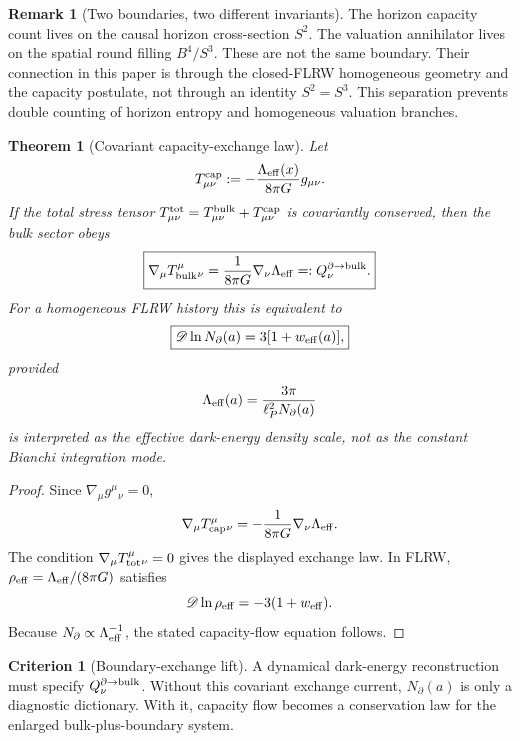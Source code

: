 \documentclass[aps,prd,reprint,nofootinbib,superscriptaddress,floatfix]{revtex4-2}
\numberwithin{equation}{section}
\theoremstyle{definition}
\newtheorem{criterion}{Criterion}[section]
\newtheorem{remark}{Remark}[section]
\theoremstyle{plain}
\newtheorem{theorem}{Theorem}[section]
\newcommand{\Dil}{\mathscr D}
\newcommand{\Ncap}{N_{\partial}}
\begin{document}
\begin{remark}[Two boundaries, two different invariants]
The horizon capacity count lives on the causal horizon cross-section
\(S^2\).  The valuation annihilator lives on the spatial round filling
\(B^4/S^3\).  These are not the same boundary.  Their connection in this
paper is through the closed-FLRW homogeneous geometry and the capacity
postulate, not through an identity \(S^2=S^3\).  This separation prevents
double counting of horizon entropy and homogeneous valuation branches.
\end{remark}

\begin{theorem}[Covariant capacity-exchange law]
\label{thm:covariant-exchange-law}
Let
\begin{equation}
T^{\rm cap}_{\mu\nu}:=-\frac{\Lambda_{\rm eff}(x)}{8\pi G}g_{\mu\nu}.
\end{equation}
If the total stress tensor \(T^{\rm tot}_{\mu\nu}=T^{\rm bulk}_{\mu\nu}+T^{\rm cap}_{\mu\nu}\) is covariantly conserved, then the bulk sector obeys
\begin{equation}
\boxed{
\nabla_\mu T_{\rm bulk}^{\mu}{}_{\nu}
=
\frac{1}{8\pi G}\nabla_\nu\Lambda_{\rm eff}
=:Q_\nu^{\partial\to{\rm bulk}} .
}
\end{equation}
For a homogeneous FLRW history this is equivalent to
\begin{equation}
\boxed{
\Dil\ln\Ncap(a)=3[1+w_{\rm eff}(a)],
}
\end{equation}
provided
\[
\Lambda_{\rm eff}(a)=\frac{3\pi}{\ell_P^2\Ncap(a)}
\]
is interpreted as the effective dark-energy density scale, not as the constant Bianchi integration mode.
\end{theorem}

\begin{proof}
Since \(\nabla_\mu g^{\mu}{}_{\nu}=0\),
\[
\nabla_\mu T_{\rm cap}^{\mu}{}_{\nu}
=
-\frac{1}{8\pi G}\nabla_\nu\Lambda_{\rm eff}.
\]
The condition \(\nabla_\mu T_{\rm tot}^{\mu}{}_{\nu}=0\) gives the displayed exchange law.  In FLRW, \(\rho_{\rm eff}=\Lambda_{\rm eff}/(8\pi G)\) satisfies
\[
\Dil\ln\rho_{\rm eff}=-3(1+w_{\rm eff}).
\]
Because \(\Ncap\propto\Lambda_{\rm eff}^{-1}\), the stated capacity-flow equation follows.
\end{proof}

\begin{criterion}[Boundary-exchange lift]
A dynamical dark-energy reconstruction must specify \(Q_\nu^{\partial\to{\rm bulk}}\).  Without this covariant exchange current, \(\Ncap(a)\) is only a diagnostic dictionary.  With it, capacity flow becomes a conservation law for the enlarged bulk-plus-boundary system.
\end{criterion}
\end{document}
